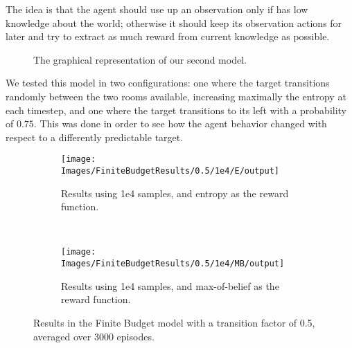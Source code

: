 The idea is that the agent should use up an observation only if has low knowledge about the world;
otherwise it should keep its observation actions for later and try to extract as much reward from
current knowledge as possible.

\begin{figure}[ht!]
\centering
{}
\caption{The graphical representation of our second model.}
\label{ref:finbudget1}
\end{figure}

We tested this model in two configurations: one where the target transitions randomly between the
two rooms available, increasing maximally the entropy at each timestep, and one where the target
transitions to its left with a probability of $0.75$. This was done in order to see how the agent behavior
changed with respect to a differently predictable target.

\begin{figure}[ht!]
        \centering
        \begin{subfigure}[t]{0.45\textwidth}
                \texttt{[image: Images/FiniteBudgetResults/0.5/1e4/E/output]}
                \caption{Results using 1e4 samples, and entropy as the reward function.}
                \label{fig:fb4e5}
        \end{subfigure}%
        ~ %
        \begin{subfigure}[t]{0.45\textwidth}
                \texttt{[image: Images/FiniteBudgetResults/0.5/1e4/MB/output]}
                \caption{Results using 1e4 samples, and max-of-belief as the reward function.}
                \label{fig:fb5e5}
        \end{subfigure}
        \caption{Results in the Finite Budget model with a transition factor of 0.5, averaged over 3000 episodes.}
        \label{ref:fbentropyfig5}
\end{figure}

